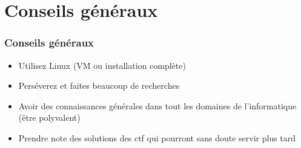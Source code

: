 \documentclass{beamer}
\begin{document}
{


}
\section{Conseils généraux}

\begin{frame}
\frametitle{Conseils généraux}

\begin{itemize}
    \item Utilisez Linux (VM ou installation complète)
    \pause
    \item Perséverez et faites beaucoup de recherches
    \pause
    \item Avoir des connaissances générales dans tout les domaines de l'informatique (être polyvalent)
    \pause
    \item Prendre note des solutions des ctf qui pourront sans doute servir plus tard
\end{itemize}


\end{frame}
\end{document}
